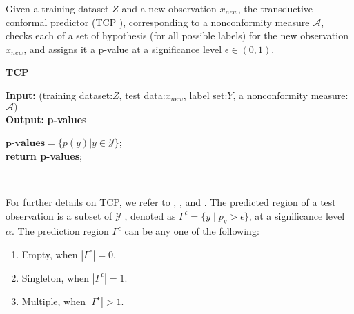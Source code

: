 \documentclass[main]{subfiles}
\begin{document}
 
\begin{definition}
Given a training dataset $Z$ and a new observation $x_{new}$, the transductive conformal predictor (TCP ), corresponding to a nonconformity measure $\mathcal{A}$, checks each of a set of hypothesis (for all possible labels) for the new observation $x_{new}$, and assigns it a p-value at a significance level $\epsilon \in (0, 1)$.  %
\end{definition}


\begin{algorithm}[H]
 \caption{\textbf{TCP}} \label{algo:TCP}
 \textbf{Input:}{ (training dataset:$Z$, test data:$x_{new}$, label set:$Y$, a nonconformity measure:$\mathcal{A})$}\\
 \textbf{Output:}{\textbf{ p-values} }\\

 $\textbf{p-values} = \{ p(y)| y \in \mathcal{Y}\}$;\\
 \textbf{return \textbf{p-values}};\\
 \end{algorithm}
 \vspace{10pt}
\textbf{ \\}

For further details on TCP, we refer to \cite{vapnik1998statistical}, \cite{shafer2008tutorial}, \cite{vovk2005algorithmic} and \cite{balasubramanian2014conformal}. The predicted region of a test observation is a subset of $\mathcal{Y}$ , denoted as $\Gamma^{\epsilon} = \{ y \mid p_y > \epsilon \}$, at a significance level $\alpha$. The prediction region $\Gamma^{\epsilon}$ can be any one of the following:
\begin{enumerate}
\item Empty, when $|\Gamma^{\epsilon}| = 0$.
\item Singleton, when $|\Gamma^{\epsilon}| = 1$.
\item Multiple, when $|\Gamma^{\epsilon}| >1$.
\end{enumerate}
 
\end{document}

